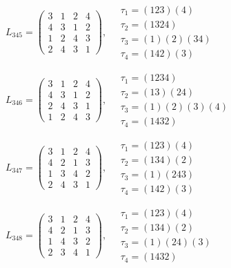 $L_{345} = \begin{pmatrix} 3 & 1 & 2 & 4 \\ 4 & 3 & 1 & 2 \\ 1 & 2 & 4 & 3 \\ 2 & 4 & 3 & 1 \end{pmatrix}, \quad \begin{matrix} \tau_{1} = (1 2 3)(4) \\ \tau_{2} = (1 3 2 4) \\ \tau_{3} = (1)(2)(3 4) \\ \tau_{4} = (1 4 2)(3) \end{matrix}$

$L_{346} = \begin{pmatrix} 3 & 1 & 2 & 4 \\ 4 & 3 & 1 & 2 \\ 2 & 4 & 3 & 1 \\ 1 & 2 & 4 & 3 \end{pmatrix}, \quad \begin{matrix} \tau_{1} = (1 2 3 4) \\ \tau_{2} = (1 3)(2 4) \\ \tau_{3} = (1)(2)(3)(4) \\ \tau_{4} = (1 4 3 2) \end{matrix}$

$L_{347} = \begin{pmatrix} 3 & 1 & 2 & 4 \\ 4 & 2 & 1 & 3 \\ 1 & 3 & 4 & 2 \\ 2 & 4 & 3 & 1 \end{pmatrix}, \quad \begin{matrix} \tau_{1} = (1 2 3)(4) \\ \tau_{2} = (1 3 4)(2) \\ \tau_{3} = (1)(2 4 3) \\ \tau_{4} = (1 4 2)(3) \end{matrix}$

$L_{348} = \begin{pmatrix} 3 & 1 & 2 & 4 \\ 4 & 2 & 1 & 3 \\ 1 & 4 & 3 & 2 \\ 2 & 3 & 4 & 1 \end{pmatrix}, \quad \begin{matrix} \tau_{1} = (1 2 3)(4) \\ \tau_{2} = (1 3 4)(2) \\ \tau_{3} = (1)(2 4)(3) \\ \tau_{4} = (1 4 3 2) \end{matrix}$

